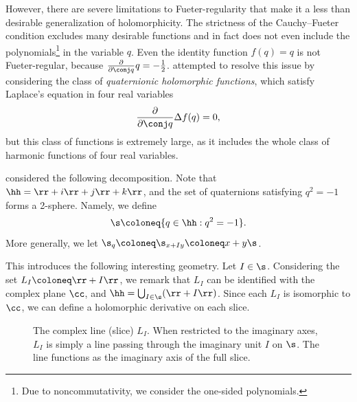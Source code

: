 \documentclass{amsart}
\begin{document}
However, there are severe limitations to Fueter-regularity that make it a less than desirable generalization of holomorphicity. The strictness of the Cauchy--Fueter condition excludes many desirable functions and in fact does not even include the polynomials\footnote{Due to noncommutativity, we consider the one-sided polynomials.} in the variable $q$. Even the identity function $f(q)=q$ is not Fueter-regular, because $\frac{\partial}{\partial \conj q} q=-\frac12$. \cite{fueter34} attempted to resolve this issue by considering the class of \emph{quaternionic holomorphic functions}, which satisfy Laplace's equation in four real variables \[\frac{\partial}{\partial \conj q}\Delta f(q)=0,\] but this class of functions is extremely large, as it includes the whole class of harmonic functions of four real variables. 

\cite{GENTILI2007279} considered the following decomposition. Note that $\hh = \rr +i\rr + j\rr + k\rr$, and the set of quaternions satisfying $q^2=-1$ forms a 2-sphere. Namely, we define \[\s\coloneq \{q\in\hh : q^2=-1\}.\] More generally, we let $\s_q\coloneq\s_{x+Iy}\coloneq x +y \s$.

This introduces the following interesting geometry. Let $I\in\s$. Considering the set $L_I\coloneq \rr + I\rr$, we remark that $L_I$ can be identified with the complex plane $\cc$, and $\hh = \bigcup_{I\in\s} (\rr + I\rr)$. Since each $L_I$ is isomorphic to $\cc$, we can define a holomorphic derivative on each slice.

\begin{figure}[ht]
\centering
{}
\caption{The complex line (slice) $L_I$. When restricted to the imaginary axes, $L_I$ is simply a line passing through the imaginary unit $I$ on $\s$. The line functions as the imaginary axis of the full slice.}
\end{figure}
\end{document}
